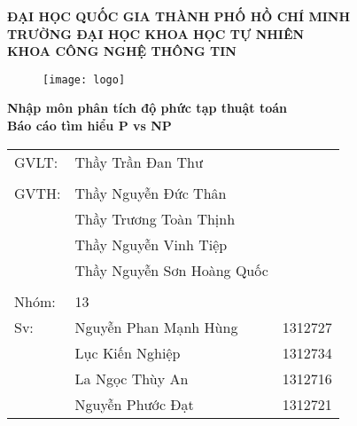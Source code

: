 \begin{titlepage}
\begin{center}
	\large{\textbf{ĐẠI HỌC QUỐC GIA THÀNH PHỐ HỒ CHÍ MINH}}\\
	\large{\textbf{TRƯỜNG ĐẠI HỌC KHOA HỌC TỰ NHIÊN}}\\
	\large{\textbf{KHOA CÔNG NGHỆ THÔNG TIN}}\\
	\vfill
	\begin{figure}[H]
		\centerline{\texttt{[image: logo]}}
	\end{figure}

	\Large{\textbf{Nhập môn phân tích độ phức tạp thuật toán}}\\
	\Large{\textbf{Báo cáo tìm hiểu P vs NP}}\\

\end{center}
	\vfill
\begin{flushright}
	
	\begin{tabular}{l l l}
		GVLT: &Thầy Trần Đan Thư\\
		&\\
		GVTH: &Thầy Nguyễn Đức Thân\\
		&Thầy Trương Toàn Thịnh\\
		&Thầy Nguyễn Vinh Tiệp\\
		&Thầy Nguyễn Sơn Hoàng Quốc\\
		&\\
		Nhóm:&13\\
		Sv: &Nguyễn Phan Mạnh Hùng & 1312727\\
		&Lục Kiến Nghiệp & 1312734\\
		&La Ngọc Thùy An & 1312716\\
		&Nguyễn Phước Đạt & 1312721\\
	\end{tabular}
\end{flushright}


\end{titlepage}
